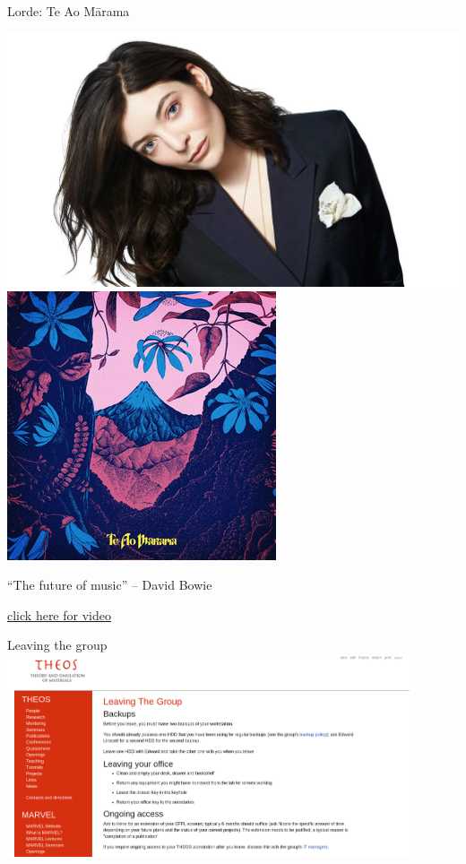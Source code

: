 \documentclass[xcolor=table,aspectratio=169]{beamer}
\author{Edward Linscott}
\institute{EPFL}
\date{6 June 2023}
\numberwithin{equation}{section}
\begin{document}
\begin{frame}{Lorde: Te Ao Mārama}
    \centering


    \includegraphics[height=0.5\paperheight]{te_ao_maarama/lorde.jpg} \hspace{1em}
    \includegraphics[height=0.5\paperheight]{te_ao_maarama/te_ao_maarama.jpg}

    \vspace{6pt}

    ``The future of music'' -- David Bowie

    \vspace{6pt}

    \tiny \href{https://www.youtube.com/watch?v=H1u0ukFst60&ab_channel=LordeVEVO}{click here for video}
\end{frame}

\begin{frame}{Leaving the group}
    \centering
    \includegraphics[width=0.9\textwidth]{figures/leaving_the_group.png}
\end{frame}
\end{document}
